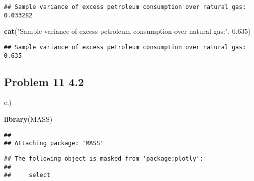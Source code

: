 \documentclass[
]{article}
\newenvironment{Shaded}{\begin{snugshade}}{\end{snugshade}}
\newcommand{\FloatTok}[1]{\textcolor[rgb]{0.00,0.00,0.81}{#1}}
\newcommand{\KeywordTok}[1]{\textcolor[rgb]{0.13,0.29,0.53}{\textbf{#1}}}
\newcommand{\NormalTok}[1]{#1}
\newcommand{\StringTok}[1]{\textcolor[rgb]{0.31,0.60,0.02}{#1}}
\begin{document}
\begin{verbatim}
## Sample variance of excess petroleum consumption over natural gas: 0.033282
\end{verbatim}

\begin{Shaded}
\begin{Highlighting}[]
\KeywordTok{cat}\NormalTok{(}\StringTok{"Sample variance of excess petroleum consumption over natural gas:"}\NormalTok{, }\FloatTok{0.635}\NormalTok{)}
\end{Highlighting}
\end{Shaded}

\begin{verbatim}
## Sample variance of excess petroleum consumption over natural gas: 0.635
\end{verbatim}

\hypertarget{problem-11-4.2}{%
\subsection{Problem 11 4.2}\label{problem-11-4.2}}

c.)

\begin{Shaded}
\begin{Highlighting}[]
\KeywordTok{library}\NormalTok{(MASS)}
\end{Highlighting}
\end{Shaded}

\begin{verbatim}
## 
## Attaching package: 'MASS'
\end{verbatim}

\begin{verbatim}
## The following object is masked from 'package:plotly':
## 
##     select
\end{verbatim}
\end{document}
